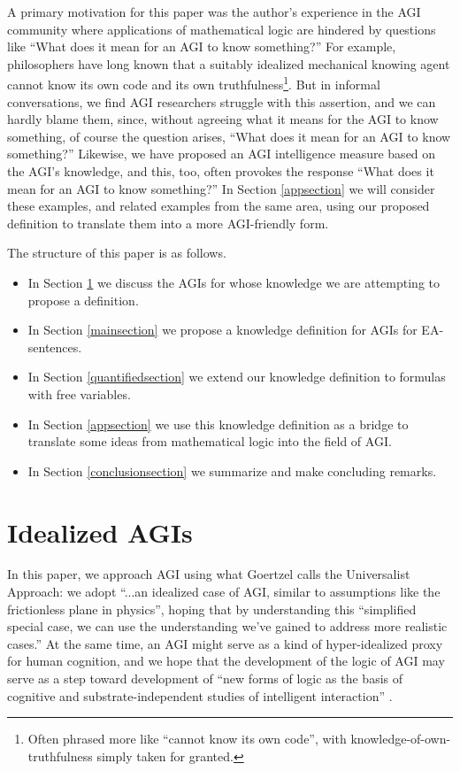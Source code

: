 \documentclass[runningheads]{llncs}
\begin{document}
A primary motivation for this
paper was the author's experience in the AGI community where applications
of mathematical logic are hindered by questions like ``What does it mean
for an AGI to know something?'' For example, philosophers
have long known that a suitably idealized mechanical
knowing agent cannot know its own code and its own truthfulness\footnote{Often
phrased more like ``cannot know its own code'', with knowledge-of-own-truthfulness
simply taken for granted.}.
But in informal conversations, we find
AGI researchers struggle with this assertion, and we can hardly blame
them, since, without agreeing what it means for the AGI to know something,
of course the question arises, ``What does it mean for
an AGI to know something?'' Likewise, we have proposed \cite{ioi2} an AGI
intelligence measure based on the AGI's knowledge, and this, too, often
provokes the response ``What does it mean for an AGI to know something?''
In Section \ref{appsection} we will consider these examples, and related
examples from the same area, using our proposed definition to translate
them into a more AGI-friendly form.


The structure of this paper is as follows.
\begin{itemize}
  \item In Section \ref{agisection} we discuss the AGIs for whose knowledge we are
  attempting to propose a definition.
  \item In Section \ref{mainsection} we propose a knowledge definition for
  AGIs for EA-sentences.
  \item In Section \ref{quantifiedsection} we extend our knowledge definition
  to formulas with free variables.
  \item In Section \ref{appsection} we use this knowledge definition as a bridge
  to translate some ideas from mathematical logic into the field of AGI.
  \item In Section \ref{conclusionsection} we summarize and make concluding remarks.
\end{itemize}

\section{Idealized AGIs}
\label{agisection}

In this paper, we approach AGI using what
Goertzel \cite{goertzel2014artificial} calls
the Universalist Approach:
we adopt ``...an idealized case of AGI, similar to
assumptions like the frictionless plane in physics'', hoping that by
understanding this ``simplified special
case, we can use the understanding we've gained to address more realistic
cases.'' At the same time, an AGI might serve as a kind of hyper-idealized
proxy for human cognition, and we hope that the development of the logic
of AGI may serve as a step toward development of ``new forms of logic as
the basis of cognitive and substrate-independent studies of intelligent interaction''
\cite{cerone2019interdisciplinary}.
\end{document}
